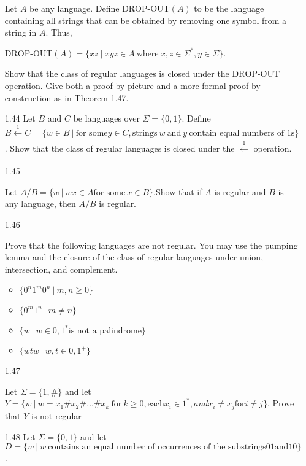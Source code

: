 \begin{enumerate}
            Let $A$ be any language. Define $\text{DROP-OUT}(A)$ to be the language containing all strings that can be obtained by removing one symbol from a string in $A$. Thus,

            $\text{DROP-OUT}(A)=\{xz ~|~ xyz \in A~ \text{where}~ x,z \in \Sigma^\ast,y \in \Sigma\}$.

            Show that the class of regular languages is closed under the $\text{DROP-OUT}$ operation. Give both a proof by picture and a more formal proof by construction as in Theorem 1.47.




      \item [1.44]
      Let $B$ and $C$ be languages over $\Sigma = \{0,1\}$. Define $B \xleftarrow[]{1} C = \{w \in B~| ~\text{for some} y \in C, \text{strings}~ w~ \text{and}~ y~ \text{contain equal numbers of }1\text{s}\}$. Show that the class of regular languages is closed under the $\xleftarrow[]{1}$ operation.   

      \item [1.45]

      Let $A/B = \{w~|~wx \in A \text{for some}~ x \in B\}$.Show that if $A$ is regular and $B$ is any language, then $A/B$ is regular.
      \item [1.46]
      
      Prove that the following languages are not regular. You may use the pumping lemma and the closure of the class of regular languages under union, intersection, and complement. 

    \begin{itemize}

      \item $\{0^n1^m0^n ~|~ m,n \ge 0\}$ 

      \item $\{0^m1^n~ |~ m \ne n\} $

      \item $\{w~|~w \in {0,1}^\ast \text{is not a palindrome}\}$

      \item $\{wtw~|~w,t \in{0,1}^+\}$

    \end{itemize}
      \item [1.47]
      
      Let $\Sigma = \{1,\#\}$ and let $Y =\{w~|~w = x_1\#x_2\#\ldots \#x_k~ \text{for}~ k \ge 0, \text{each} x_i \in 1^\ast, and x_i \ne x_j \text{for} i \ne j\}$. Prove that $Y$ is not regular
      \item [1.48]
      Let $\Sigma=\{0,1\}$ and let $D=\{w~|~w ~\text{contains an equal number of occurrences of the substrings} 01 \text{and} 10\}$. 
            

\end{enumerate}
